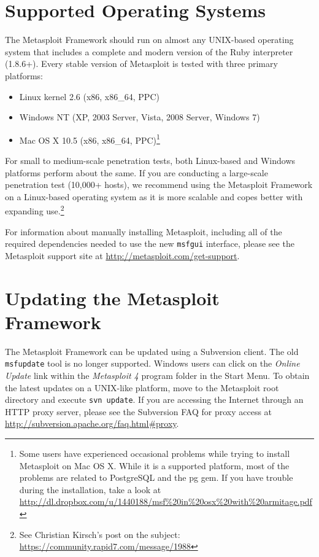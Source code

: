 \documentclass{report}
\begin{document}
    \section{Supported Operating Systems}
    \label{INSTALL-SUPPORT}

\par
The Metasploit Framework should run on almost any UNIX-based operating system
that includes a complete and modern version of the Ruby interpreter (1.8.6+).
Every stable version of Metasploit is tested with three primary platforms:

\begin{itemize}
\item Linux kernel 2.6 (x86, x86\_64, PPC)
\item Windows NT (XP, 2003 Server, Vista, 2008 Server, Windows 7)
\item Mac OS X 10.5 (x86, x86\_64, PPC)\footnote{Some users have experienced
      occasional problems while trying to install Metasploit on Mac OS X.
      While it is a supported platform, most of the problems are related to
      PostgreSQL and the pg gem. If you have trouble during the installation,
      take a look at
      \url{http://dl.dropbox.com/u/1440188/msf\%20in\%20osx\%20with\%20armitage.pdf}}
\end{itemize}

\par
For small to medium-scale penetration tests, both Linux-based and Windows
platforms perform about the same. If you are conducting a large-scale
penetration test (10,000+ hosts), we recommend using the Metasploit Framework
on a Linux-based operating system as it is more scalable and copes better with
expanding use.\footnote{See Christian Kirsch's post on the subject:
\url{https://community.rapid7.com/message/1988}}

\par
For information about manually installing Metasploit, including all of the
required dependencies needed to use the new \texttt{msfgui} interface, please
see the Metasploit support site at \url{http://metasploit.com/get-support}.

    \section{Updating the Metasploit Framework}
    \label{INSTALL-UPDATE}

\par
The Metasploit Framework can be updated using a Subversion client. The old
\texttt{msfupdate} tool is no longer supported. Windows users can click on the
\textit{Online Update} link within the \textit{Metasploit 4} program folder in
the Start Menu. To obtain the latest updates on a UNIX-like platform, move to
the Metasploit root directory and execute \texttt{svn update}. If you are
accessing the Internet through an HTTP proxy server, please see the Subversion
FAQ for proxy access at \url{http://subversion.apache.org/faq.html#proxy}.
\end{document}
